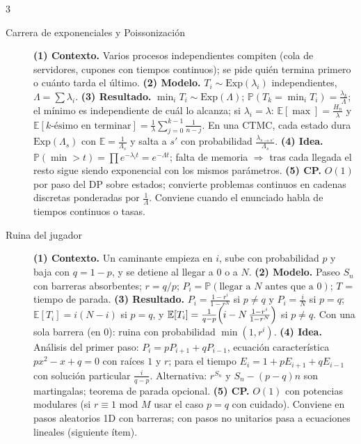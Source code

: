 \documentclass[8pt, spanish, mexico, letterpaper]{extarticle}
\newcommand{\E}{\mathbb{E}}
\newcommand{\Prob}{\mathbb{P}}
\newcommand{\<}{<}
\begin{document}
\begin{multicols*}{3}
\begin{description}
\item[Carrera de exponenciales y Poissonizaci\'on] \textbf{(1) Contexto.} Varios procesos independientes compiten (cola de servidores, cupones con tiempos continuos); se pide qui\'en termina primero o cu\'anto tarda el \'ultimo. \textbf{(2) Modelo.} $T_i\sim\mathrm{Exp}(\lambda_i)$ independientes, $\Lambda=\sum\lambda_i$. \textbf{(3) Resultado.} $\min_iT_i\sim\mathrm{Exp}(\Lambda)$; $\Prob(T_k=\min_iT_i)=\frac{\lambda_k}{\Lambda}$; el m\'inimo es independiente de cu\'al lo alcanza; si $\lambda_i{=}\lambda$: $\E[\max]=\frac{H_n}{\lambda}$ y $\E[k\text{-\'esimo en terminar}]=\frac1\lambda\sum_{j=0}^{k-1}\frac1{n-j}$. En una CTMC, cada estado dura $\mathrm{Exp}(\Lambda_s)$ con $\E=\frac1{\Lambda_s}$ y salta a $s'$ con probabilidad $\frac{\lambda_{s\to s'}}{\Lambda_s}$. \textbf{(4) Idea.} $\Prob(\min>t)=\prod e^{-\lambda_it}=e^{-\Lambda t}$; falta de memoria $\Rightarrow$ tras cada llegada el resto sigue siendo exponencial con los mismos par\'ametros. \textbf{(5) CP.} $O(1)$ por paso del DP sobre estados; convierte problemas continuos en cadenas discretas ponderadas por $\frac1\Lambda$. Conviene cuando el enunciado habla de tiempos continuos o tasas.

\item[Ruina del jugador] \textbf{(1) Contexto.} Un caminante empieza en $i$, sube con probabilidad $p$ y baja con $q=1 - p$, y se detiene al llegar a $0$ o a $N$. \textbf{(2) Modelo.} Paseo $S_n$ con barreras absorbentes; $r=q/p$; $P_i=\Prob(\text{llegar a }N\text{ antes que a }0)$; $T$ = tiempo de parada. \textbf{(3) Resultado.} $P_i=\frac{1-r^i}{1-r^N}$ si $p\ne q$ y $P_i=\frac iN$ si $p=q$; $\E[T_i]=i(N - i)$ si $p=q$, y $\E[T_i]=\frac1{q-p}\Bigl(i-N\,\frac{1-r^i}{1-r^N}\Bigr)$ si $p\ne q$. Con una sola barrera (en $0$): ruina con probabilidad $\min(1,r^i)$. \textbf{(4) Idea.} An\'alisis del primer paso: $P_i=pP_{i+1}+qP_{i-1}$, ecuaci\'on caracter\'istica $px^2-x+q=0$ con ra\'ices $1$ y $r$; para el tiempo $E_i=1+pE_{i+1}+qE_{i-1}$ con soluci\'on particular $\frac i{q-p}$. Alternativa: $r^{S_n}$ y $S_n-(p-q)n$ son martingalas; teorema de parada opcional. \textbf{(5) CP.} $O(1)$ con potencias modulares (si $r\equiv1$ mod $M$ usar el caso $p=q$ con cuidado). Conviene en pasos aleatorios 1D con barreras; con pasos no unitarios pasa a ecuaciones lineales (siguiente \'item).


\end{description}
\end{multicols*}
\end{document}
